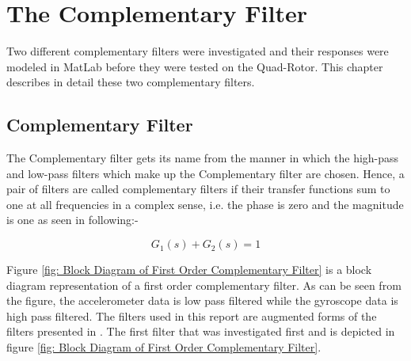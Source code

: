 \chapter{The Complementary Filter}
Two different complementary filters were investigated and their responses were modeled in MatLab before they were tested on the Quad-Rotor. This chapter describes in detail these two complementary filters.

\section{ Complementary Filter}
The Complementary filter gets its name from the manner in which the high-pass and low-pass filters which make up the Complementary filter are chosen. Hence, a pair of filters are called complementary filters if their transfer functions sum to one at all frequencies in a complex sense, i.e. the phase is zero and the magnitude is one as seen in following:-

\begin{equation}
	G_1(s) + G_2(s) =1 \label{eq: bases of comp filter1}
\end{equation}



Figure \ref{fig: Block Diagram of First Order Complementary Filter} is a block diagram representation of a first order complementary filter. As can be seen from the figure, the accelerometer data is low pass filtered while the gyroscope data is high pass filtered. The filters used in this report are augmented forms of the filters presented in \cite{sprague2001design,comp_filter_mit}. The first filter that was investigated first and is depicted in figure \ref{fig: Block Diagram of First Order Complementary Filter}.


\newcommand{\suma}{\Large$+$}
\newcommand{\inte}{$\displaystyle \int$}
\newcommand{\derv}{\huge$\frac{d}{dt}$}


